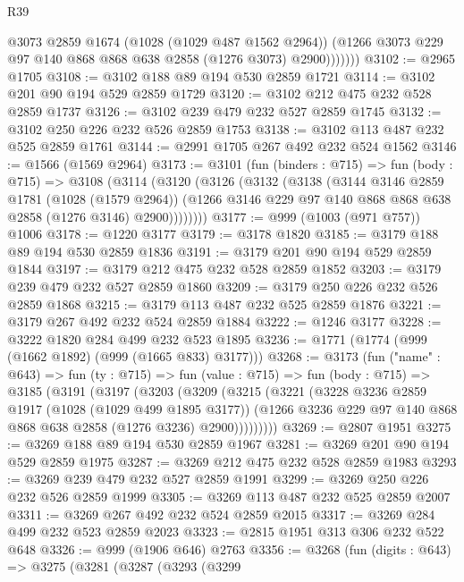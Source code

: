 \begin{lexlean}{R39}
\begin{coremodule}
                @3073
                @2859
                @1674
                (@1028 (@1029 @487 @1562 @2964))
                (@1266 @3073 @229 @97 @140 @868 @868 @638 @2858 (@1276 @3073) @2900)))))))
@3102 := @2965 @1705
@3108 := @3102 @188 @89 @194 @530 @2859 @1721
@3114 := @3102 @201 @90 @194 @529 @2859 @1729
@3120 := @3102 @212 @475 @232 @528 @2859 @1737
@3126 := @3102 @239 @479 @232 @527 @2859 @1745
@3132 := @3102 @250 @226 @232 @526 @2859 @1753
@3138 := @3102 @113 @487 @232 @525 @2859 @1761
@3144 := @2991 @1705 @267 @492 @232 @524 @1562
@3146 := @1566 (@1569 @2964)
@3173 := @3101
    (fun (binders : @715) =>
    fun (body : @715) =>
    @3108
      (@3114
        (@3120
          (@3126
            (@3132
              (@3138
                (@3144
                  @3146
                  @2859
                  @1781
                  (@1028 (@1579 @2964))
                  (@1266 @3146 @229 @97 @140 @868 @868 @638 @2858 (@1276 @3146) @2900))))))))
@3177 := @999 (@1003 (@971 @757)) @1006
@3178 := @1220 @3177
@3179 := @3178 @1820
@3185 := @3179 @188 @89 @194 @530 @2859 @1836
@3191 := @3179 @201 @90 @194 @529 @2859 @1844
@3197 := @3179 @212 @475 @232 @528 @2859 @1852
@3203 := @3179 @239 @479 @232 @527 @2859 @1860
@3209 := @3179 @250 @226 @232 @526 @2859 @1868
@3215 := @3179 @113 @487 @232 @525 @2859 @1876
@3221 := @3179 @267 @492 @232 @524 @2859 @1884
@3222 := @1246 @3177
@3228 := @3222 @1820 @284 @499 @232 @523 @1895
@3236 := @1771 (@1774 (@999 (@1662 @1892) (@999 (@1665 @833) @3177)))
@3268 := @3173
    (fun ("name" : @643) =>
    fun (ty : @715) =>
    fun (value : @715) =>
    fun (body : @715) =>
    @3185
      (@3191
        (@3197
          (@3203
            (@3209
              (@3215
                (@3221
                  (@3228
                    @3236
                    @2859
                    @1917
                    (@1028 (@1029 @499 @1895 @3177))
                    (@1266 @3236 @229 @97 @140 @868 @868 @638 @2858 (@1276 @3236) @2900)))))))))
@3269 := @2807 @1951
@3275 := @3269 @188 @89 @194 @530 @2859 @1967
@3281 := @3269 @201 @90 @194 @529 @2859 @1975
@3287 := @3269 @212 @475 @232 @528 @2859 @1983
@3293 := @3269 @239 @479 @232 @527 @2859 @1991
@3299 := @3269 @250 @226 @232 @526 @2859 @1999
@3305 := @3269 @113 @487 @232 @525 @2859 @2007
@3311 := @3269 @267 @492 @232 @524 @2859 @2015
@3317 := @3269 @284 @499 @232 @523 @2859 @2023
@3323 := @2815 @1951 @313 @306 @232 @522 @648
@3326 := @999 (@1906 @646) @2763
@3356 := @3268
    (fun (digits : @643) =>
    @3275
      (@3281
        (@3287
          (@3293
            (@3299

\end{coremodule}
\end{lexlean}
